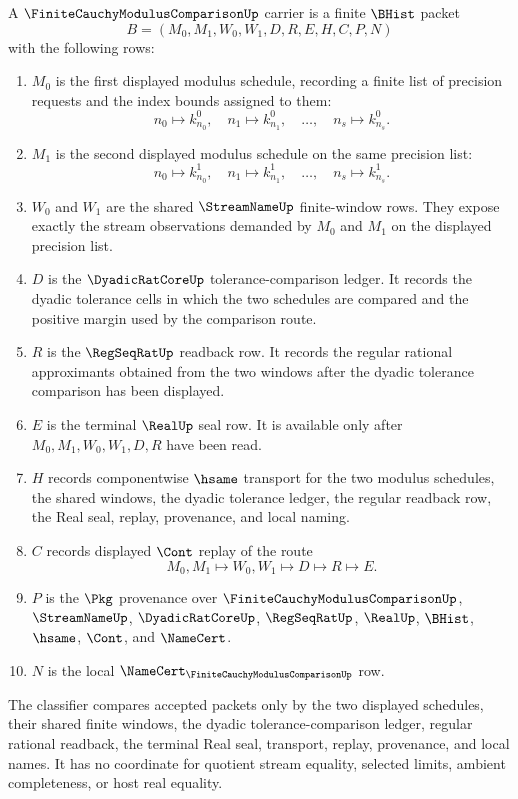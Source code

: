 \begin{definition}
\label{def:finite-cauchy-modulus-comparison-carrier}
A $\FiniteCauchyModulusComparisonUp$ carrier is a finite $\BHist$ packet
$$
B=(M_0,M_1,W_0,W_1,D,R,E,H,C,P,N)
$$
with the following rows:
\begin{enumerate}
\item $M_0$ is the first displayed modulus schedule, recording a finite list of precision requests and the index bounds assigned to them:
$$
n_0 \mapsto k^0_{n_0},\quad n_1 \mapsto k^0_{n_1},\quad \ldots,\quad n_s \mapsto k^0_{n_s}.
$$
\item $M_1$ is the second displayed modulus schedule on the same precision list:
$$
n_0 \mapsto k^1_{n_0},\quad n_1 \mapsto k^1_{n_1},\quad \ldots,\quad n_s \mapsto k^1_{n_s}.
$$
\item $W_0$ and $W_1$ are the shared $\StreamNameUp$ finite-window rows. They expose exactly the stream observations demanded by $M_0$ and $M_1$ on the displayed precision list.
\item $D$ is the $\DyadicRatCoreUp$ tolerance-comparison ledger. It records the dyadic tolerance cells in which the two schedules are compared and the positive margin used by the comparison route.
\item $R$ is the $\RegSeqRatUp$ readback row. It records the regular rational approximants obtained from the two windows after the dyadic tolerance comparison has been displayed.
\item $E$ is the terminal $\RealUp$ seal row. It is available only after $M_0,M_1,W_0,W_1,D,R$ have been read.
\item $H$ records componentwise $\hsame$ transport for the two modulus schedules, the shared windows, the dyadic tolerance ledger, the regular readback row, the Real seal, replay, provenance, and local naming.
\item $C$ records displayed $\Cont$ replay of the route
$$
M_0,M_1 \longmapsto W_0,W_1 \longmapsto D \longmapsto R \longmapsto E .
$$
\item $P$ is the $\Pkg$ provenance over $\FiniteCauchyModulusComparisonUp$, $\StreamNameUp$, $\DyadicRatCoreUp$, $\RegSeqRatUp$, $\RealUp$, $\BHist$, $\hsame$, $\Cont$, and $\NameCert$.
\item $N$ is the local $\NameCert_{\FiniteCauchyModulusComparisonUp}$ row.
\end{enumerate}
The classifier compares accepted packets only by the two displayed schedules, their shared finite windows, the dyadic tolerance-comparison ledger, regular rational readback, the terminal Real seal, transport, replay, provenance, and local names. It has no coordinate for quotient stream equality, selected limits, ambient completeness, or host real equality.
\end{definition}

